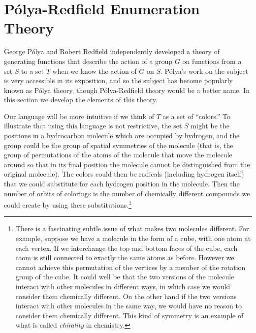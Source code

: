 \documentclass[10pt,]{book}
\theoremstyle{plain}
\theoremstyle{definition}
\numberwithin{equation}{chapter}
\begin{document}
\section[{Pólya-Redfield Enumeration Theory}]{Pólya-Redfield Enumeration Theory}\label{sec_groups-polya}
\typeout{************************************************}
\typeout{************************************************}
George Pólya and Robert Redfield independently developed a theory of generating functions that describe the action of a group \(G\) on functions from a set \(S\) to a set \(T\) when we know the action of \(G\) on \(S\). Pólya's work on the subject is very accessible in its exposition, and so the subject has become popularly known as Pólya theory, though Pólya-Redfield theory would be a better name. In this section we develop the elements of this theory.%
\par
Our language will be more intuitive if we think of \(T\) as a set of ``colors.'' To illustrate that using this language is not restrictive, the set \(S\) might be the positions in a hydrocarbon molecule which are occupied by hydrogen, and the group could be the group of spatial symmetries of the molecule (that is, the group of permutations of the atoms of the molecule that move the molecule around so that in its final position the molecule cannot be distinguished from the original molecule). The colors could then be radicals (including hydrogen itself) that we could substitute for each hydrogen position in the molecule. Then the number of orbits of colorings is the number of chemically different compounds we could create by using these substitutions.\footnote{There is a fascinating subtle issue of what makes two molecules different.  For example, suppose we have a molecule in the form of a cube, with one atom at each vertex.  If we interchange the top and bottom faces of the cube, each atom is still connected to exactly the same atoms as before.   However we cannot achieve this permutation of the vertices by a member of the rotation group of the cube.  It could well be that the two versions of the molecule interact with other molecules in different ways, in which case we would consider them chemically different.  On the other hand if the two versions interact with other molecules in the same way, we would have no reason to consider them chemically different.  This kind of symmetry is an example of what is called \emph{chirality} in chemistry.\label{fn-24}}%
\par
\end{document}
